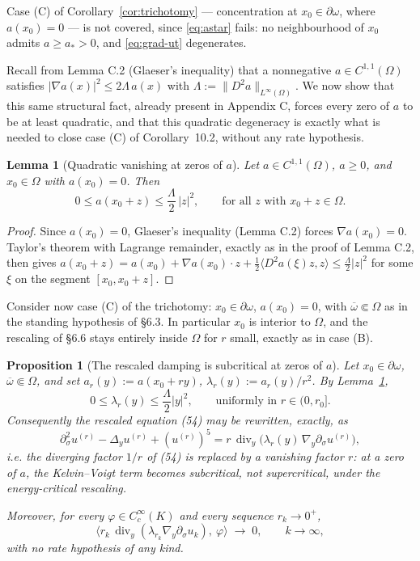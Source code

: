 \documentclass[11pt,letterpaper]{amsart}
\newtheorem{lemma}[theorem]{Lemma}
\newtheorem{proposition}[theorem]{Proposition}
\begin{document}
Case (C) of Corollary~\ref{cor:trichotomy} --- concentration at $x_0\in\partial\omega$, where
$a(x_0)=0$ --- is not covered, since \eqref{eq:astar} fails: no neighbourhood of $x_0$ admits
$a\ge a_*>0$, and \eqref{eq:grad-ut} degenerates.

Recall from Lemma C.2 (Glaeser's inequality) that a nonnegative $a\in C^{1,1}(\Omega)$
satisfies $|\nabla a(x)|^2 \le 2\Lambda\, a(x)$ with $\Lambda := \|D^2a\|_{L^\infty(\Omega)}$.
We now show that this same structural fact, already present in Appendix C, forces every
zero of $a$ to be at least quadratic, and that this quadratic degeneracy is exactly what
is needed to close case (C) of Corollary~10.2, without any rate hypothesis.

\begin{lemma}[Quadratic vanishing at zeros of $a$]\label{lem:quadratic}
Let $a\in C^{1,1}(\Omega)$, $a\ge 0$, and $x_0\in\Omega$ with $a(x_0)=0$. Then
\[
0 \le a(x_0+z) \le \frac{\Lambda}{2}\,|z|^2, \qquad \text{for all } z \text{ with } x_0+z\in\Omega.
\]
\end{lemma}

\begin{proof}
Since $a(x_0)=0$, Glaeser's inequality (Lemma C.2) forces $\nabla a(x_0)=0$.
Taylor's theorem with Lagrange remainder, exactly as in the proof of Lemma C.2, then gives
$a(x_0+z) = a(x_0) + \nabla a(x_0)\cdot z + \tfrac12\langle D^2a(\xi)z,z\rangle
\le \tfrac{\Lambda}{2}|z|^2$ for some $\xi$ on the segment $[x_0,x_0+z]$.
\end{proof}

Consider now case (C) of the trichotomy: $x_0\in\partial\omega$, $a(x_0)=0$, with
$\overline\omega\Subset\Omega$ as in the standing hypothesis of \S6.3. In particular
$x_0$ is interior to $\Omega$, and the rescaling of \S6.6 stays entirely inside $\Omega$
for $r$ small, exactly as in case (B).

\begin{proposition}[The rescaled damping is subcritical at zeros of $a$]\label{prop:subcritical}
Let $x_0\in\partial\omega$, $\overline\omega\Subset\Omega$, and set
$a_r(y) := a(x_0+ry)$, $\lambda_r(y) := a_r(y)/r^2$. By Lemma~\ref{lem:quadratic},
\[
0 \le \lambda_r(y) \le \frac{\Lambda}{2}|y|^2, \qquad \text{uniformly in } r\in(0,r_0].
\]
Consequently the rescaled equation (54) may be rewritten, exactly, as
\[
\partial_\sigma^2 u^{(r)} - \Delta_y u^{(r)} + (u^{(r)})^5
= r\,\operatorname{div}_y\!\big(\lambda_r(y)\,\nabla_y \partial_\sigma u^{(r)}\big), \tag{54$'$}
\]
i.e. the diverging factor $1/r$ of (54) is replaced by a \emph{vanishing} factor $r$: at a
zero of $a$, the Kelvin--Voigt term becomes \emph{subcritical}, not supercritical, under the
energy-critical rescaling.

Moreover, for every $\varphi\in C_c^\infty(K)$ and every sequence $r_k\to 0^+$,
\[
\big\langle r_k\,\operatorname{div}_y(\lambda_{r_k}\nabla_y\partial_\sigma u_k),\ \varphi\big\rangle
\;\longrightarrow\; 0, \qquad k\to\infty,
\]
with no rate hypothesis of any kind.
\end{proposition}
\end{document}
